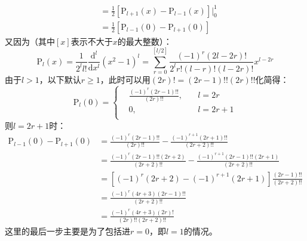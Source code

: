 \documentclass[a4paper,fontset=none]{ctexart}
\begin{document}
\begin{itemize}
\begin{align*}
            &= \frac{1}{2}\left[\mathrm{P}_{l+1}(x)-\mathrm{P}_{l-1}(x)\right]\Big|_0^1 \\
            &= \frac{1}{2}\left[\mathrm{P}_{l-1}(0)-\mathrm{P}_{l+1}(0)\right]
        \end{align*}
        又因为（其中$[x]$表示不大于$x$的最大整数）：
        \[
        \mathrm{P}_l(x) = \frac{1}{2^l l!}\frac{\mathrm{d}^l}{\mathrm{d}x^l}(x^2-1)^l = \sum_{r=0}^{[l/2]}\frac{(-1)^r(2l-2r)!}{2^l r!(l-r)!(l-2r)!}x^{l-2r}
        \]
        由于$l>1$，以下默认$r\geqslant1$，此时可以用$(2r)!=(2r-1)!!(2r)!!$化简得：
        \[
        \mathrm{P}_l(0)=\left\{
            \begin{aligned}
                &\frac{(-1)^r(2r-1)!!}{(2r)!!},\quad &l=2r \\
                &0,\quad &l=2r+1 \\
            \end{aligned}
        \right.
        \]
        则$l=2r+1$时：
        \begin{align*}
        \mathrm{P}_{l-1}(0)-\mathrm{P}_{l+1}(0)
        &= \frac{(-1)^r(2r-1)!!}{(2r)!!} - \frac{(-1)^{r+1}(2r+1)!!}{(2r+2)!!} \\
        &= \frac{(-1)^r(2r-1)!!(2r+2)}{(2r+2)!!} - \frac{(-1)^{r+1}(2r-1)!!(2r+1)}{(2r+2)!!} \\
        &= \left[(-1)^r(2r+2)-(-1)^{r+1}(2r+1)\right]\frac{(2r-1)!!}{(2r+2)!!} \\
        &= \frac{(-1)^r(4r+3)(2r-1)!!}{(2r+2)!!} \\
        &= \frac{(-1)^r(4r+3)(2r)!}{(2r)!!(2r+2)!!}
        \end{align*}
        这里的最后一步主要是为了包括进$r=0$，即$l=1$的情况。


\end{itemize}
\end{document}
